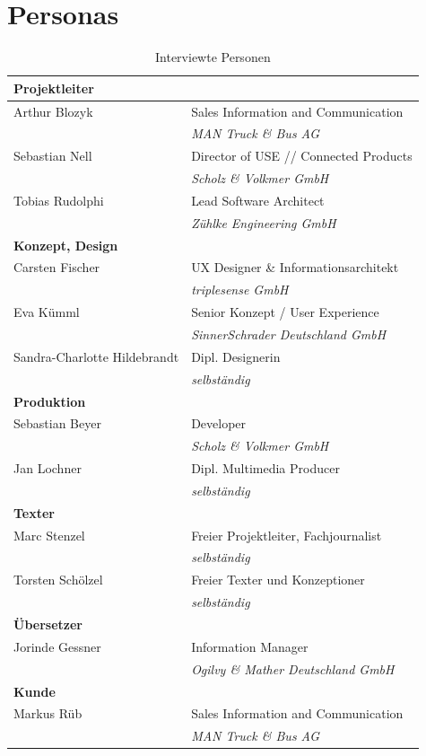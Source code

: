 \section{Personas}\label{l:personas}

\begin{table}
\begin{center}
\begin{tabular}{@{}l l}
\textbf{Projektleiter} &\\
\hline
Arthur Blozyk & Sales Information and Communication\\ 
& \emph{MAN Truck \& Bus AG}\\
Sebastian Nell & Director of USE // Connected Products\\
& \emph{Scholz \& Volkmer GmbH}\\
Tobias Rudolphi	& Lead Software Architect\\
& \emph{Zühlke Engineering GmbH}\\
\textbf{Konzept, Design} &\\
\hline
Carsten Fischer	& UX Designer \& Informationsarchitekt\\
& \emph{triplesense GmbH}\\
Eva Kümml & Senior Konzept / User Experience\\
& \emph{SinnerSchrader Deutschland GmbH}\\
Sandra-Charlotte Hildebrandt & Dipl. Designerin\\
& \emph{selbständig}\\
\textbf{Produktion} &\\
\hline
Sebastian Beyer	& Developer\\
& \emph{Scholz \& Volkmer GmbH}\\
Jan Lochner	& Dipl. Multimedia Producer\\
& \emph{selbständig}\\
\textbf{Texter} &\\
\hline
Marc Stenzel & Freier Projektleiter, Fachjournalist\\
& \emph{selbständig}\\
Torsten Schölzel & Freier Texter und Konzeptioner\\
& \emph{selbständig}\\
\textbf{Übersetzer} &\\
\hline
Jorinde Gessner	& Information Manager\\
& \emph{Ogilvy \& Mather Deutschland GmbH}\\
\textbf{Kunde} &\\
\hline
Markus Rüb & Sales Information and Communication\\
& \emph{MAN Truck \& Bus AG}
\end{tabular}
\caption{Interviewte Personen}
\label{table:interviewpartner}
\end{center}
\end{table}

